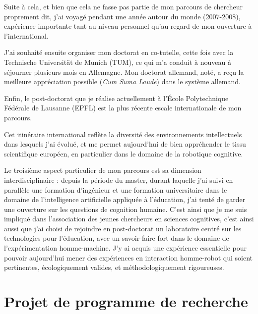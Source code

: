 \documentclass[a4paper]{article}
\begin{document}
Suite à cela, et bien que cela ne fasse pas partie de mon parcours de chercheur
proprement dit, j'ai voyagé pendant une année autour du monde (2007-2008),
expérience importante tant au niveau personnel qu'au regard de mon ouverture à
l'international.

J'ai souhaité ensuite organiser mon doctorat en co-tutelle, cette
fois avec la Technische Universität de Munich (TUM), ce qui m'a conduit à
nouveau à séjourner plusieurs mois en Allemagne. Mon doctorat allemand, noté, a
reçu la meilleure appréciation possible (\emph{Cum Suma Laude}) dans le système
allemand.

Enfin, le post-doctorat que je réalise actuellement à l'École Polytechnique
Fédérale de Lausanne (EPFL) est la plus récente escale internationale de mon
parcours.

Cet itinéraire international reflète la diversité des environnements
intellectuels dans lesquels j'ai évolué, et me permet aujourd'hui de bien
appréhender le tissu scientifique européen, en particulier dans le domaine de la
robotique cognitive.

Le troisième aspect particulier de mon parcours est sa dimension
interdisciplinaire : depuis la période du master, durant laquelle j'ai suivi en
parallèle une formation d'ingénieur et une formation universitaire dans le
domaine de l'intelligence artificielle appliquée à l'éducation, j'ai tenté de
garder une ouverture sur les questions de cognition humaine. C'est ainsi que je
me suis impliqué dans l'association des jeunes chercheurs en sciences
cognitives, c'est ainsi aussi que j'ai choisi de rejoindre en post-doctorat un
laboratoire centré sur les technologies pour l'éducation, avec un savoir-faire
fort dans le domaine de l'expérimentation homme-machine. J'y ai acquis une
expérience essentielle pour pouvoir aujourd'hui mener des expériences en
interaction homme-robot qui soient pertinentes, écologiquement valides, et
méthodologiquement rigoureuses.

\printbibliography
\clearpage


\section{Projet de programme de recherche}
\newrefsection
\end{document}
